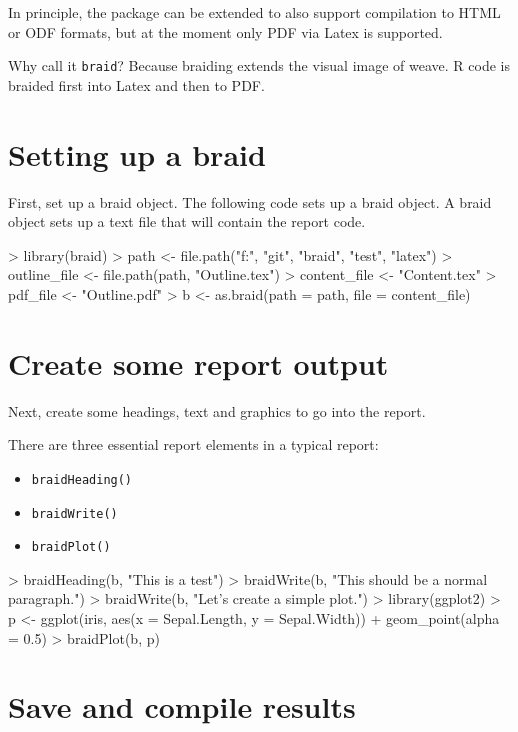 \documentclass[a4paper]{article}
\newcommand{\braid}{{\tt braid}}
\newcommand{\code}[1]{{\tt #1}}
\begin{document}
In principle, the package can be extended to also support compilation to HTML or ODF formats, but at the moment only PDF via Latex is supported.

Why call it \braid{}?  Because braiding extends the visual image of weave. R code is braided first into Latex and then to PDF. 


\section{Setting up a braid}

First, set up a braid object.  The following code sets up a braid object.  A braid object sets up a text file that will contain the report code.

\begin{Schunk}
\begin{Sinput}
> library(braid)
> path <- file.path("f:", "git", "braid", "test", "latex")
> outline_file <- file.path(path, "Outline.tex")
> content_file <- "Content.tex"
> pdf_file <- "Outline.pdf"
> b <- as.braid(path = path, file = content_file)
\end{Sinput}
\end{Schunk}

\section{Create some report output}

Next, create some headings, text and graphics to go into the report.

There are three essential report elements in a typical report:

\begin{itemize}
	\item \code{braidHeading()}
	\item \code{braidWrite()}
	\item \code{braidPlot()}
\end{itemize}


\begin{Schunk}
\begin{Sinput}
> braidHeading(b, "This is a test")
> braidWrite(b, "This should be a normal paragraph.")
> braidWrite(b, "Let's create a simple plot.")
> library(ggplot2)
> p <- ggplot(iris, aes(x = Sepal.Length, y = Sepal.Width)) + geom_point(alpha = 0.5)
> braidPlot(b, p)
\end{Sinput}
\end{Schunk}

\section{Save and compile results}
\end{document}
